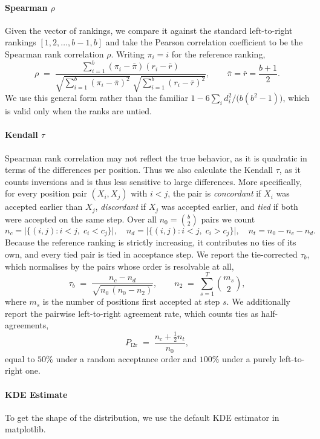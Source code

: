 \paragraph{Spearman $\rho$}
Given the vector of rankings, we compare it against the standard
left-to-right rankings $[1, 2, \dots, b-1, b]$ and take the Pearson
correlation coefficient to be the Spearman rank correlation $\rho$. Writing
$\pi_i = i$ for the reference ranking,
\begin{equation}
  \rho \;=\;
  \frac{\sum_{i=1}^{b} (\pi_i - \bar{\pi})(r_i - \bar{r})}
       {\sqrt{\sum_{i=1}^{b} (\pi_i - \bar{\pi})^{2}}\;
        \sqrt{\sum_{i=1}^{b} (r_i - \bar{r})^{2}}},
  \qquad \bar{\pi} = \bar{r} = \frac{b+1}{2}.
\end{equation}
We use this general form rather than the familiar
$1 - 6\sum_i d_i^{2}/\bigl(b(b^{2}-1)\bigr)$, which is valid only when the
ranks are untied.

\paragraph{Kendall $\tau$}
Spearman rank correlation may not reflect the true behavior, as it is
quadratic in terms of the differences per position. Thus we also calculate
the Kendall $\tau$, as it counts inversions and is thus less sensitive to
large differences. More specifically, for every position pair $(X_i, X_j)$
with $i < j$, the pair is \emph{concordant} if $X_i$ was accepted earlier
than $X_j$, \emph{discordant} if $X_j$ was accepted earlier, and
\emph{tied} if both were accepted on the same step. Over all
$n_0 = \binom{b}{2}$ pairs we count
\begin{equation}
  n_c = \bigl|\{(i,j) : i<j,\; c_i < c_j\}\bigr|, \quad
  n_d = \bigl|\{(i,j) : i<j,\; c_i > c_j\}\bigr|, \quad
  n_t = n_0 - n_c - n_d .
\end{equation}
Because the reference ranking is strictly increasing, it contributes no
ties of its own, and every tied pair is tied in acceptance step. We report the
tie-corrected $\tau_b$, which normalises by the pairs whose order is
resolvable at all,
\begin{equation}
  \tau_b \;=\; \frac{n_c - n_d}{\sqrt{n_0\,(n_0 - n_2)}},
  \qquad
  n_2 \;=\; \sum_{s=1}^{T} \binom{m_s}{2},
\end{equation}
where $m_s$ is the number of positions first accepted at step $s$. We
additionally report the pairwise left-to-right agreement rate, which counts
ties as half-agreements,
\begin{equation}
  P_{\mathrm{l2r}} \;=\; \frac{n_c + \tfrac{1}{2} n_t}{n_0},
\end{equation}
equal to $50\%$ under a random acceptance order and $100\%$ under a purely
left-to-right one.

\paragraph{KDE Estimate}
To get the shape of the distribution, we use the default KDE estimator in matplotlib. 

% 
% 
% 